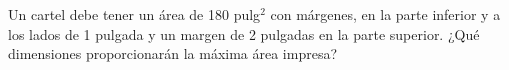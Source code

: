 \item Un cartel debe tener un área de 180 pulg$^2$ con márgenes, en la parte inferior y a los lados de 1 pulgada y un margen de 2 pulgadas en la parte superior. ¿Qué dimensiones proporcionarán la máxima área impresa?
